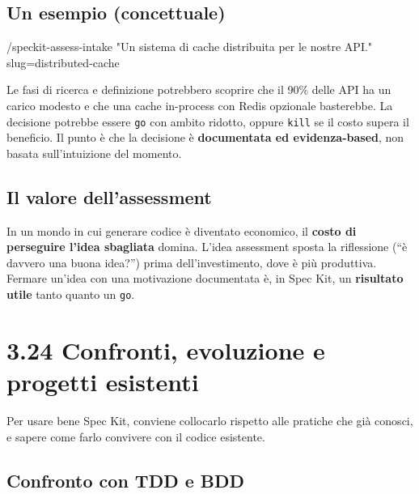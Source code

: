 \documentclass[
  italian,
  10pt,
]{book}
\newenvironment{Shaded}{\begin{snugshade}}{\end{snugshade}}
\newcommand{\NormalTok}[1]{#1}
\begin{document}
\subsection{Un esempio (concettuale)}\label{un-esempio-concettuale}

\begin{Shaded}
\begin{Highlighting}[]
\NormalTok{/speckit{-}assess{-}intake "Un sistema di cache distribuita per le nostre API."}
\NormalTok{slug=distributed{-}cache}
\end{Highlighting}
\end{Shaded}

Le fasi di ricerca e definizione potrebbero scoprire che il 90\% delle
API ha un carico modesto e che una cache in-process con Redis opzionale
basterebbe. La decisione potrebbe essere \texttt{go} con ambito ridotto,
oppure \texttt{kill} se il costo supera il beneficio. Il punto è che la
decisione è \textbf{documentata ed evidenza-based}, non basata
sull'intuizione del momento.

\subsection{Il valore dell'assessment}\label{il-valore-dellassessment}

In un mondo in cui generare codice è diventato economico, il
\textbf{costo di perseguire l'idea sbagliata} domina. L'idea assessment
sposta la riflessione (``è davvero una buona idea?'') prima
dell'investimento, dove è più produttiva. Fermare un'idea con una
motivazione documentata è, in Spec Kit, un \textbf{risultato utile}
tanto quanto un \texttt{go}.

\section{3.24 Confronti, evoluzione e progetti
esistenti}\label{confronti-evoluzione-e-progetti-esistenti}

Per usare bene Spec Kit, conviene collocarlo rispetto alle pratiche che
già conosci, e sapere come farlo convivere con il codice esistente.

\subsection{Confronto con TDD e BDD}\label{confronto-con-tdd-e-bdd}

\footnotesize
\end{document}
